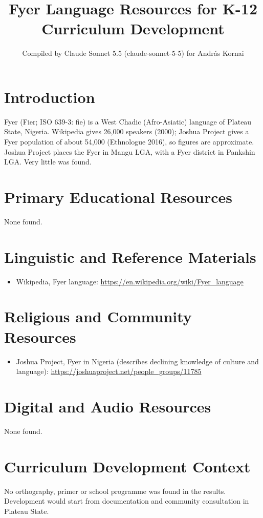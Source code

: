 \documentclass[12pt]{article}
\title{Fyer Language Resources for K-12 Curriculum Development}
\author{Compiled by Claude Sonnet 5.5 (claude-sonnet-5-5) for Andr\'as Kornai}
\date{}
\begin{document}
\maketitle

\section{Introduction}
Fyer (Fier; ISO 639-3: fie) is a West Chadic (Afro-Asiatic) language of Plateau State, Nigeria. Wikipedia gives 26,000 speakers (2000); Joshua Project gives a Fyer population of about 54,000 (Ethnologue 2016), so figures are approximate. Joshua Project places the Fyer in Mangu LGA, with a Fyer district in Pankshin LGA. Very little was found.

\section{Primary Educational Resources}
None found.

\section{Linguistic and Reference Materials}
\begin{itemize}
\item Wikipedia, Fyer language: \url{https://en.wikipedia.org/wiki/Fyer_language}
\end{itemize}

\section{Religious and Community Resources}
\begin{itemize}
\item Joshua Project, Fyer in Nigeria (describes declining knowledge of culture and language): \url{https://joshuaproject.net/people_groups/11785}
\end{itemize}

\section{Digital and Audio Resources}
None found.

\section{Curriculum Development Context}
No orthography, primer or school programme was found in the results. Development would start from documentation and community consultation in Plateau State.
\end{document}
